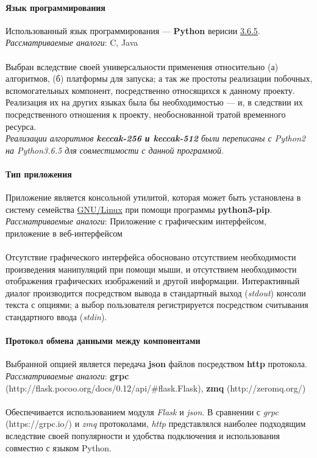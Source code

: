 \paragraph{Язык программирования}
Использованный язык программирования --- \textbf{Python} верисии
\underline{3.6.5}.\\
\emph{Рассматриваемые аналоги}: C, Java\\\\
Выбран вследствие своей универсальности применения
относительно (а) алгоритмов, (б) платформы для запуска; а так же простоты
реализации побочных, вспомогательных компонент, посредственно относящихся к
данному проекту. Реализация их на других языках была бы необходимостью --- и, в
следствии их посредственного отношения к проекту, необоснованной тратой
временного ресурса.\\
\emph{Реализации алгоритмов \textbf{keccak-256 \emph{ и } keccak-512} были
переписаны с Python2 на Python3.6.5 для совместимости с данной программой}.

\paragraph{Тип приложения}
Приложение является консольной утилитой, которая может быть установлена в
систему семейства \underline{GNU/Linux} при помощи программы
\textbf{python3-pip}.\\
\emph{Рассматриваемые аналоги}: Приложение с графическим интерфейсом,
приложение в веб-интерфейсом\\\\
Отсутствие графического интерфейса обосновано отсутствием
необходимости произведения манипуляций при помощи мыши, и отсутствием
необходимости отображения графических изображений и другой информации.
Интерактивный диалог производится посредством вывода в стандартный выход
(\emph{stdout}) консоли текста с опциями; а выбор пользователя регистрируется
посредством считывания стандартного ввода (\emph{stdin}).

\paragraph{Протокол обмена данными между компонентами}
Выбранной опцией является передача \textbf{json} файлов посредством \textbf{http} протокола.\\
\emph{Рассматриваемые аналоги}: \textbf{grpc}
(http://flask.pocoo.org/docs/0.12/api/\#flask.Flask), \textbf{zmq}
(http://zeromq.org/)\\\\
Обеспечивается использованием модуля \emph{Flask} и \emph{json}. В сравнении
с \emph{grpc} (https://grpc.io/) и \textit{zmq} протоколами, \emph{http}
представлялся наиболее подходящим вследствие своей популярности и удобства
подключения и использования совместно с языком Python.

